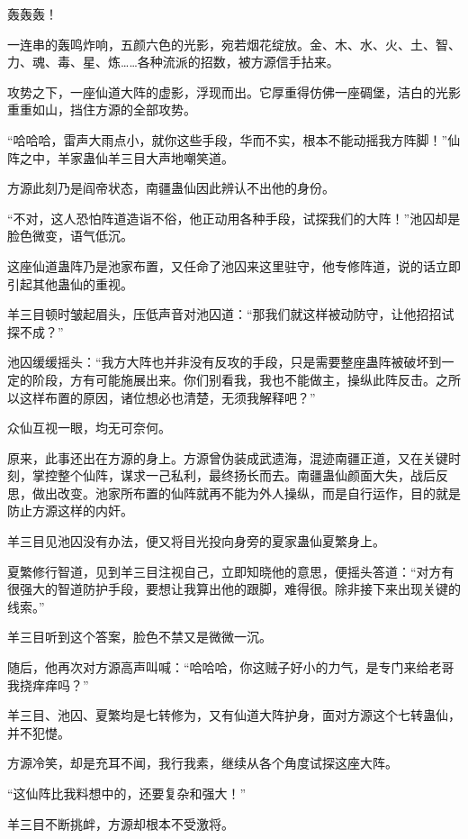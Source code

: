 
\begin{this_body}

轰轰轰！

一连串的轰鸣炸响，五颜六色的光影，宛若烟花绽放。金、木、水、火、土、智、力、魂、毒、星、炼……各种流派的招数，被方源信手拈来。

攻势之下，一座仙道大阵的虚影，浮现而出。它厚重得仿佛一座碉堡，洁白的光影重重如山，挡住方源的全部攻势。

“哈哈哈，雷声大雨点小，就你这些手段，华而不实，根本不能动摇我方阵脚！”仙阵之中，羊家蛊仙羊三目大声地嘲笑道。

方源此刻乃是阎帝状态，南疆蛊仙因此辨认不出他的身份。

“不对，这人恐怕阵道造诣不俗，他正动用各种手段，试探我们的大阵！”池囚却是脸色微变，语气低沉。

这座仙道蛊阵乃是池家布置，又任命了池囚来这里驻守，他专修阵道，说的话立即引起其他蛊仙的重视。

羊三目顿时皱起眉头，压低声音对池囚道：“那我们就这样被动防守，让他招招试探不成？”

池囚缓缓摇头：“我方大阵也并非没有反攻的手段，只是需要整座蛊阵被破坏到一定的阶段，方有可能施展出来。你们别看我，我也不能做主，操纵此阵反击。之所以这样布置的原因，诸位想必也清楚，无须我解释吧？”

众仙互视一眼，均无可奈何。

原来，此事还出在方源的身上。方源曾伪装成武遗海，混迹南疆正道，又在关键时刻，掌控整个仙阵，谋求一己私利，最终扬长而去。南疆蛊仙颜面大失，战后反思，做出改变。池家所布置的仙阵就再不能为外人操纵，而是自行运作，目的就是防止方源这样的内奸。

羊三目见池囚没有办法，便又将目光投向身旁的夏家蛊仙夏繁身上。

夏繁修行智道，见到羊三目注视自己，立即知晓他的意思，便摇头答道：“对方有很强大的智道防护手段，要想让我算出他的跟脚，难得很。除非接下来出现关键的线索。”

羊三目听到这个答案，脸色不禁又是微微一沉。

随后，他再次对方源高声叫喊：“哈哈哈，你这贼子好小的力气，是专门来给老哥我挠痒痒吗？”

羊三目、池囚、夏繁均是七转修为，又有仙道大阵护身，面对方源这个七转蛊仙，并不犯憷。

方源冷笑，却是充耳不闻，我行我素，继续从各个角度试探这座大阵。

“这仙阵比我料想中的，还要复杂和强大！”

羊三目不断挑衅，方源却根本不受激将。


\end{this_body}
